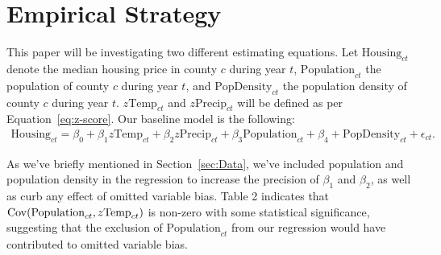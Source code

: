 \documentclass[12pt,reqno]{amsart}
\theoremstyle{definition}
\begin{document}
\section{Empirical Strategy}\label{sec:emp-strat}

    This paper will be investigating two different estimating equations. Let $\text{Housing}_{ct}$ denote the median housing price in county $c$ during year $t$, $\text{Population}_{ct}$ the population of county $c$ during year $t$, and $\text{PopDensity}_{ct}$ the population density of county $c$ during year $t$. $z\text{Temp}_{ct}$ and $z\text{Precip}_{ct}$ will be defined as per Equation~\ref{eq:z-score}. Our baseline model is the following:
        \begin{equation}\label{eq:reg1}
        \begin{split}
            \text{Housing}_{ct} = \beta_0 + \beta_1 z\text{Temp}_{ct} + \beta_2 z\text{Precip}_{ct} + \beta_3 \text{Population}_{ct} + \beta_4 + \text{PopDensity}_{ct} + \epsilon_{ct}.
        \end{split}
        \end{equation}

    As we've briefly mentioned in Section~\ref{sec:Data}, we've included population and population density in the regression to increase the precision of $\beta_1$ and $\beta_2$, as well as curb any effect of omitted variable bias. Table 2 indicates that $\operatorname{Cov}(\text{Population}_{ct},z\text{Temp}_{ct})$ is non-zero with some statistical significance, suggesting that the exclusion of $\text{Population}_{ct}$ from our regression would have contributed to omitted variable bias. 
\end{document}
